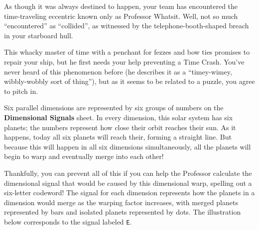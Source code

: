 As though it was always destined to happen, your team has encountered
the time-traveling eccentric known only as Professor Whatsit. Well, not
so much ``encountered'' as ``collided'', as witnessed by the 
telephone-booth-shaped breach in your starboard hull.

This whacky master of time with a penchant for fezzes and bow ties promises to
repair your ship, but he first needs your help preventing a
Time Crash. You've never heard of this phenomenon before (he describes it as a
``timey-wimey, wibbly-wobbly sort of thing''), but as it seems to be 
related to a puzzle, you agree to pitch in.

Six parallel dimensions are represented by six groups of numbers on
the \textbf{Dimensional Signals} sheet. In every dimension, this solar system
has six planets; the numbers represent how close their orbit reaches their sun.
As it happens, today all six planets will reach their, forming a straight line. 
But because this will happen
in all six dimensions simultaneously, all the planets will begin
to warp and eventually merge into each other!
%

Thankfully, you can prevent all of this if you can help the Professor
calculate the dimensional signal that would be caused by this dimensional
warp, spelling out a six-letter codeword!
The signal for each dimension represents how
the planets in a dimension would merge as the warping factor increases,
with merged planets represented by bars and isolated planets represented
by dots. The illustration below corresponds to the signal labeled \texttt{E}.

